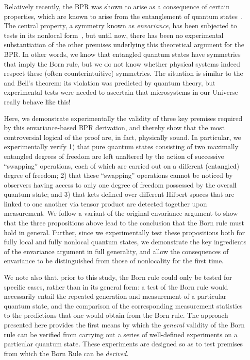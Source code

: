 \documentclass[12pt]{iopart}
\begin{document}
Relatively recently, the BPR was shown to arise as a consequence of certain properties, which are known to arise from the entanglement of quantum states~\cite{zurek:03a}. The central property, a symmetry known as \textit{envariance}, has been subjected to tests in its nonlocal form~\cite{vermeyden:15}, but until now, there has been no experimental substantiation of the other premises underlying this theoretical argument for the BPR. In other words, we know that entangled quantum states have symmetries that imply the Born rule, but we do not know whether physical systems indeed respect these (often counterintuitive) symmetries. The situation is similar to the  and Bell's theorem: its violation was predicted by quantum theory, but experimental tests were needed to ascertain that microsystems in our Universe really behave like this!

Here, we demonstrate experimentally the validity of three key premises required by this envariance-based BPR derivation, and thereby show that the most controversial logical  of the proof are, in fact, physically sound. {In particular, we experimentally verify 1) that pure quantum states consisting of two maximally entangled degrees of freedom are left unaltered by the action of successive ``swapping'' operations, each of which are carried out on a different (entangled) degree of freedom; 2) that these ``swapping'' operations cannot be noticed by observers having access to only one degree of freedom possessed by the overall quantum state; and 3) that kets defined over different Hilbert spaces that are linked to one another via tensor product are detected together upon measurement. We follow a variant of the original envariance argument to show that the three propositions above lead to the conclusion that the Born rule must hold in general. Further, since we experimentally test these propositions both for fully local and fully nonlocal quantum states, we demonstrate the key ingredients of the envariance argument in full generality, and allow the consequences of envariance to be distinguished from those of nonlocality for the first time.}

We note also that, prior to this study, the Born rule could only be tested for specific cases, rather than in its general form: a test of the Born rule would necessarily entail the repeated generation and measurement of a particular quantum state, and the comparison of the corresponding measurement  statistics to the predictions that one would obtain from the Born rule. The approach presented here provides the first means by which the \emph{general} validity of the Born rule can be verified from carrying out a series of well-defined experiments on a particular quantum state. These experiments are designed so as to test premises from which the Born Rule can be \emph{derived}.
\end{document}
